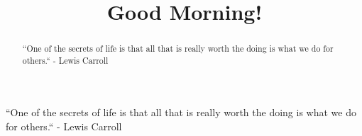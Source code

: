 \documentclass{ximera}
\title{Good Morning!}
\begin{document}
\begin{abstract}
``One of the secrets of life is that all that is really worth the doing is what we do for others.`` - Lewis Carroll
\end{abstract}
``One of the secrets of life is that all that is really worth the doing is what we do for others.`` - Lewis Carroll
\maketitle
\end{document}
